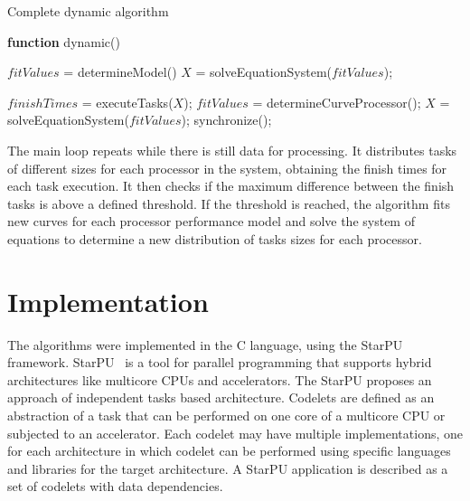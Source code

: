 \documentclass[journal]{IEEEtran}
\begin{document}
\begin{algorithm}

\caption{Complete dynamic algorithm}
\label{alg1}

\begin{algorithmic}		

\STATE \textbf{function} dynamic()

\STATE $fitValues$ = determineModel()
\STATE $X$ = solveEquationSystem($fitValues$);


	\STATE $finishTimes$ = executeTasks($X$);
		\STATE $fitValues$ = determineCurveProcessor();
                \STATE $X$ = solveEquationSystem($fitValues$);
                \STATE synchronize();
    	\ENDIF
\ENDWHILE

\end{algorithmic}
\end{algorithm}


The main loop repeats while there is still data for processing. It distributes
tasks of different sizes for each processor in the system, obtaining the finish
times for each task execution. It then checks if the maximum difference between
the finish tasks is above a defined threshold. If the threshold is reached, the
algorithm fits new curves for each processor performance model and solve the
system of equations to determine a new distribution of tasks sizes for each
processor.


\section{Implementation}

The algorithms were implemented in the C language, using the StarPU framework.
StarPU~\cite{starpu} is a tool for parallel programming that supports hybrid
architectures like multicore CPUs and accelerators. The StarPU proposes an
approach of independent tasks based architecture. Codelets are defined as an
abstraction of a task that can be performed on one core of a multicore CPU or
subjected to an accelerator. Each codelet may have multiple implementations, one
for each architecture in which codelet can be performed using specific languages
and libraries for the target architecture. A StarPU application is described as
a set of codelets with data dependencies.
\end{document}
